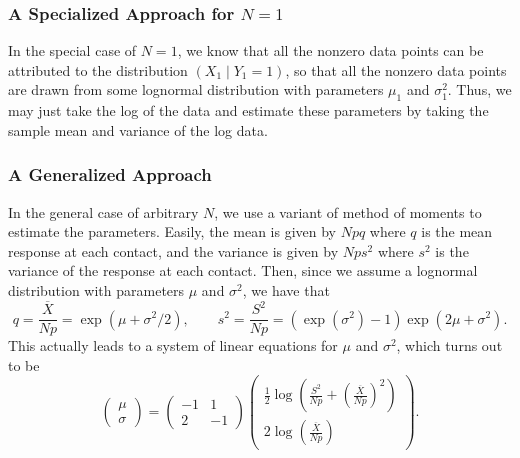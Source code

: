 \documentclass{article}
\begin{document}
\subsubsection{A Specialized Approach for $N=1$}
In the special case of $N=1$, we know that all the nonzero data points can be attributed to the distribution $(X_1\mid Y_1 = 1)$, so that all the nonzero data points are drawn from some lognormal distribution with parameters $\mu_1$ and $\sigma_1^2$. Thus, we may just take the log of the data and estimate these parameters by taking the sample mean and variance of the log data. 

\subsubsection{A Generalized Approach}
In the general case of arbitrary $N$, we use a variant of method of moments to estimate the parameters. Easily, the mean is given by $Npq$ where $q$ is the mean response at each contact,  and the variance is given by $Nps^2$ where $s^2$ is the variance of the response at each contact. Then, since we assume a lognormal distribution with parameters $\mu$ and $\sigma^2$, we have that
\[
	q = \frac{\overline X}{Np} = \exp\left(\mu+\sigma^2/2\right), \qquad s^2 = \frac{S^2}{Np} = \left(\exp(\sigma^2)-1\right)\exp\left(2\mu+\sigma^2\right). 
\]
This actually leads to a system of linear equations for $\mu$ and $\sigma^2$, which turns out to be
\[
  \begin{pmatrix}\mu\\\sigma\end{pmatrix} = \begin{pmatrix}-1&1\\2&-1\end{pmatrix}\begin{pmatrix}\frac12\log\left(\frac{S^2}{Np} + \left(\frac{\overline X}{Np}\right)^2\right)\\2\log\left(\frac{\overline X}{Np}\right)\end{pmatrix}.
\]




\end{document}
